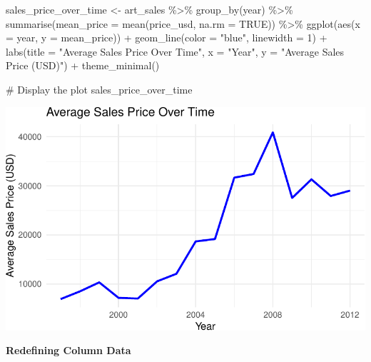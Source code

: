 \documentclass[
  12pt,
]{article}
\newenvironment{Shaded}{\begin{snugshade}}{\end{snugshade}}
\newcommand{\AttributeTok}[1]{\textcolor[rgb]{0.40,0.45,0.13}{#1}}
\newcommand{\CommentTok}[1]{\textcolor[rgb]{0.37,0.37,0.37}{#1}}
\newcommand{\ConstantTok}[1]{\textcolor[rgb]{0.56,0.35,0.01}{#1}}
\newcommand{\DecValTok}[1]{\textcolor[rgb]{0.68,0.00,0.00}{#1}}
\newcommand{\FunctionTok}[1]{\textcolor[rgb]{0.28,0.35,0.67}{#1}}
\newcommand{\NormalTok}[1]{\textcolor[rgb]{0.00,0.23,0.31}{#1}}
\newcommand{\OtherTok}[1]{\textcolor[rgb]{0.00,0.23,0.31}{#1}}
\newcommand{\SpecialCharTok}[1]{\textcolor[rgb]{0.37,0.37,0.37}{#1}}
\newcommand{\StringTok}[1]{\textcolor[rgb]{0.13,0.47,0.30}{#1}}
\begin{document}
\begin{Shaded}
\begin{Highlighting}[]
\NormalTok{sales\_price\_over\_time }\OtherTok{\textless{}{-}}\NormalTok{ art\_sales }\SpecialCharTok{\%\textgreater{}\%}
  \FunctionTok{group\_by}\NormalTok{(year) }\SpecialCharTok{\%\textgreater{}\%}
  \FunctionTok{summarise}\NormalTok{(}\AttributeTok{mean\_price =} \FunctionTok{mean}\NormalTok{(price\_usd, }\AttributeTok{na.rm =} \ConstantTok{TRUE}\NormalTok{)) }\SpecialCharTok{\%\textgreater{}\%}
  \FunctionTok{ggplot}\NormalTok{(}\FunctionTok{aes}\NormalTok{(}\AttributeTok{x =}\NormalTok{ year, }\AttributeTok{y =}\NormalTok{ mean\_price)) }\SpecialCharTok{+}
  \FunctionTok{geom\_line}\NormalTok{(}\AttributeTok{color =} \StringTok{"blue"}\NormalTok{, }\AttributeTok{linewidth =} \DecValTok{1}\NormalTok{) }\SpecialCharTok{+}
  \FunctionTok{labs}\NormalTok{(}\AttributeTok{title =} \StringTok{"Average Sales Price Over Time"}\NormalTok{, }\AttributeTok{x =} \StringTok{"Year"}\NormalTok{, }\AttributeTok{y =} \StringTok{"Average Sales Price (USD)"}\NormalTok{) }\SpecialCharTok{+}
  \FunctionTok{theme\_minimal}\NormalTok{()}

\CommentTok{\# Display the plot}
\NormalTok{sales\_price\_over\_time}
\end{Highlighting}
\end{Shaded}

\includegraphics{506-HW-5_files/figure-pdf/unnamed-chunk-7-1.pdf}

\textbf{Redefining Column Data}
\end{document}
